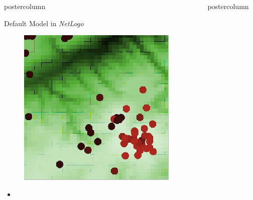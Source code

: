 \documentclass[final,hyperref={pdfpagelabels=false}]{beamer}
\newlength{\columnheight}
\begin{document}
\begin{frame}
\begin{columns}
\begin{column}{.33\textwidth}
\begin{beamercolorbox}[center,wd=\textwidth]{postercolumn}
\begin{minipage}[T]{.95\textwidth}
{\begin{block}{Default Model in \textit{NetLogo}}
\begin{figure}
                \includegraphics[width=1.0\linewidth]{images/netlogo}
              \end{figure}
              \begin{itemize}
                \item
              \end{itemize}
            \end{block}
          }
        \end{minipage}
      \end{beamercolorbox}
    \end{column}

    \begin{column}{.33\textwidth}
      \begin{beamercolorbox}[center,wd=\textwidth]{postercolumn}
        \begin{minipage}[T]{.95\textwidth} %
          \parbox[t][\columnheight]{\textwidth}{ %

}
\end{minipage}
\end{beamercolorbox}
\end{column}
\end{columns}
\end{frame}
\end{document}
